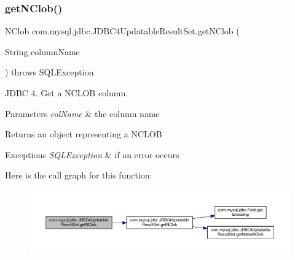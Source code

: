 \subsubsection{\texorpdfstring{get\+N\+Clob()}{getNClob()}\hspace{0.1cm}{\footnotesize\ttfamily [2/2]}}
{\footnotesize\ttfamily N\+Clob com.\+mysql.\+jdbc.\+J\+D\+B\+C4\+Updatable\+Result\+Set.\+get\+N\+Clob (\begin{DoxyParamCaption}\item[{String}]{column\+Name }\end{DoxyParamCaption}) throws S\+Q\+L\+Exception}

J\+D\+BC 4. Get a N\+C\+L\+OB column.


\begin{DoxyParams}{Parameters}
{\em col\+Name} & the column name\\
\hline
\end{DoxyParams}
\begin{DoxyReturn}{Returns}
an object representing a N\+C\+L\+OB
\end{DoxyReturn}

\begin{DoxyExceptions}{Exceptions}
{\em S\+Q\+L\+Exception} & if an error occurs \\
\hline
\end{DoxyExceptions}
Here is the call graph for this function\+:
\nopagebreak
\begin{figure}[H]
\begin{center}
\leavevmode
\includegraphics[width=350pt]{classcom_1_1mysql_1_1jdbc_1_1_j_d_b_c4_updatable_result_set_abb2658c291ff8cee90f88b5767bace90_cgraph}
\end{center}
\end{figure}
\mbox{\label{classcom_1_1mysql_1_1jdbc_1_1_j_d_b_c4_updatable_result_set_a1ae3fcafdcb02c78190318d321aa0fd2}} 
